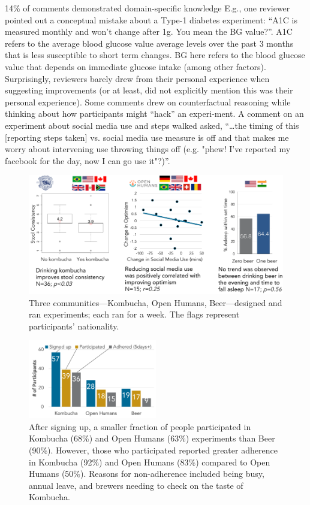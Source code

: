 14\% of comments demonstrated domain-specific knowledge E.g., one reviewer pointed out a conceptual mistake about a Type-1 diabetes experiment: “A1C is measured monthly and won't change after 1g. You mean the BG value?”. A1C refers to the average blood glucose value average levels over the past 3 months that is less susceptible to short term changes. BG here refers to the blood glucose value that depends on immediate glucose intake (among other factors). Surprisingly, reviewers barely drew from their personal experience when suggesting improvements (or at least, did not explicitly mention this was their personal experience). Some comments drew on counterfactual reasoning while thinking about how participants might “hack” an experi-ment. A comment on an experiment about social media use and steps walked asked, “…the timing of this [reporting steps taken] vs. social media use measure is off and that makes me worry about intervening use throwing things off (e.g. "phew! I've reported my facebook for the day, now I can go use it"?)”. 


\begin{figure}[h] 
\centering
  \includegraphics[width=1.0\textwidth]{figures/galileo/galileo-study3}
  \caption[]
{Three communities—Kombucha, Open Humans, Beer—designed and ran experiments; each ran for a week. The flags represent participants’ nationality. }
  \label{fig:galileo-result3}
\end{figure}

\begin{figure}[h] 
\centering
  \includegraphics[width=0.5\textwidth]{figures/galileo/galileo-study3-1}
  \caption[]
{After signing up, a smaller fraction of people participated in Kombucha (68\%) and Open Humans (63\%) experiments than Beer (90\%). However, those who participated reported greater adherence in Kombucha (92\%) and Open Humans (83\%) compared to Open Humans (50\%). Reasons for non-adherence included being busy, annual leave, and brewers needing to check on the taste of Kombucha. }
  \label{fig:galileo-result3-1}
\end{figure}

